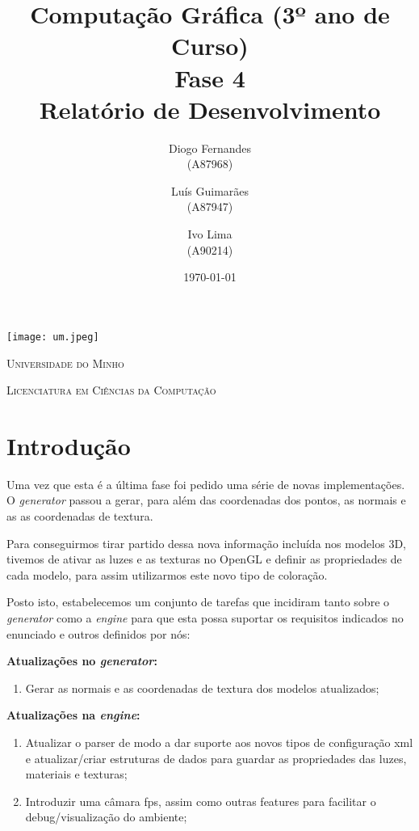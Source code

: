 \documentclass[11pt,a4paper]{report}
\title{Computação Gráfica (3º ano de Curso)\\
       \textbf{Fase 4}\\ Relatório de Desenvolvimento
       } %
\author{Diogo Fernandes\\ (A87968) \and Luís Guimarães\\ (A87947)
         \and Ivo Lima\\ (A90214)
       } %
\date{\today} %
\begin{document}
	\begin{minipage}{0.9\linewidth}
        \centering
		\texttt{[image: um.jpeg]}\par\vspace{1cm}
		{\scshape\LARGE Universidade do Minho} \par
		\vspace{0.6cm}
		{\scshape\Large Licenciatura em Ciências da Computação} \par
		\maketitle
	\end{minipage}


\tableofcontents %

\chapter{Introdução}
Uma vez que esta é a última fase foi pedido uma série de novas implementações. O \emph{generator} passou a gerar, para além das coordenadas dos pontos, as normais e as as coordenadas de textura. 

Para conseguirmos tirar partido dessa nova informação incluída nos modelos 3D, tivemos de ativar as luzes e as texturas no OpenGL e definir as propriedades de cada modelo, para assim utilizarmos este novo tipo de coloração.

Posto isto, estabelecemos um conjunto de tarefas que incidiram tanto sobre o \emph{generator} como a \emph{engine} para que esta possa suportar os requisitos indicados no enunciado e outros definidos por nós:

{\bfseries Atualizações no \emph{generator}:}
\begin{enumerate} 
\item Gerar as normais e as coordenadas de textura dos modelos atualizados;
\end{enumerate}

{\bfseries Atualizações na \emph{engine}:}
\begin{enumerate} 
\item Atualizar o parser de modo a dar suporte aos novos tipos de configuração xml e atualizar/criar estruturas de dados para guardar as propriedades das luzes, materiais e texturas;
\item Introduzir uma câmara fps, assim como outras features para facilitar o debug/visualização do ambiente;
\end{enumerate}
\end{document}
